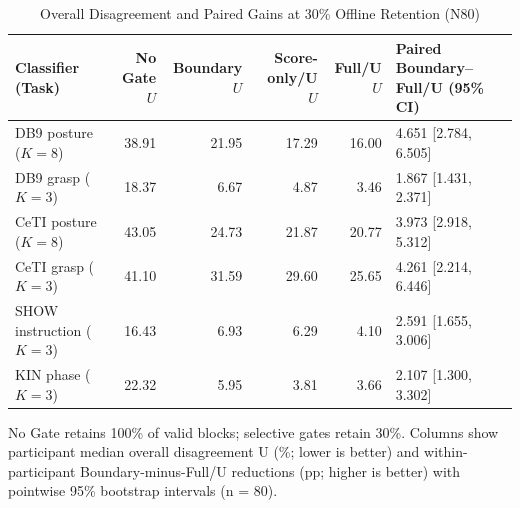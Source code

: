 \begin{table}[!t]
\centering
\caption{Overall Disagreement and Paired Gains at 30\% Offline Retention (N80)}
\label{tab:overall}
\begingroup
\small
\setlength{\tabcolsep}{3pt}
\renewcommand{\arraystretch}{1.05}
\begin{tabular}{lrrrrl}
\toprule
Classifier (Task) & No Gate $U$ & Boundary $U$ & Score-only/U $U$ & Full/U $U$ & Paired Boundary--Full/U (95\% CI)\\
\midrule
DB9 posture ($K=8$) & 38.91 & 21.95 & 17.29 & 16.00 & 4.651 [2.784, 6.505]\\
DB9 grasp ($K=3$) & 18.37 & 6.67 & 4.87 & 3.46 & 1.867 [1.431, 2.371]\\
CeTI posture ($K=8$) & 43.05 & 24.73 & 21.87 & 20.77 & 3.973 [2.918, 5.312]\\
CeTI grasp ($K=3$) & 41.10 & 31.59 & 29.60 & 25.65 & 4.261 [2.214, 6.446]\\
SHOW instruction ($K=3$) & 16.43 & 6.93 & 6.29 & 4.10 & 2.591 [1.655, 3.006]\\
KIN phase ($K=3$) & 22.32 & 5.95 & 3.81 & 3.66 & 2.107 [1.300, 3.302]\\
\bottomrule
\end{tabular}
\par\smallskip
\begin{minipage}{\linewidth}\footnotesize
No Gate retains 100\% of valid blocks; selective gates retain 30\%. Columns show participant median overall disagreement U (\%; lower is better) and within-participant Boundary-minus-Full/U reductions (pp; higher is better) with pointwise 95\% bootstrap intervals (n = 80).
\end{minipage}
\endgroup

\end{table}
